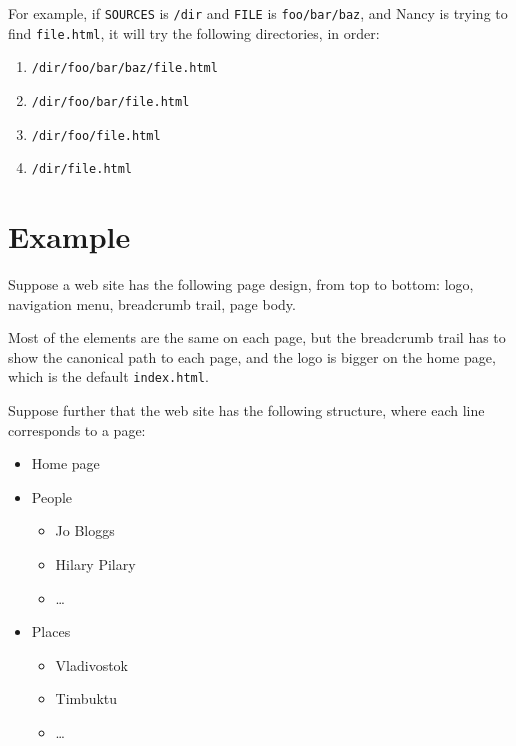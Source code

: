 \documentclass[english]{scrartcl}
\begin{document}
\begin{enumerate}
For example, if \verb|SOURCES| is \verb|/dir| and \verb|FILE| is \verb|foo/bar/baz|, and Nancy is trying to find \verb|file.html|, it will try the following directories, in order:

\begin{enumerate}
\item \verb|/dir/foo/bar/baz/file.html|
\item \verb|/dir/foo/bar/file.html|
\item \verb|/dir/foo/file.html|
\item \verb|/dir/file.html|
\end{enumerate}

\section{Example}

Suppose a web site has the following page design, from top to bottom: logo, navigation menu, breadcrumb trail, page body.

Most of the elements are the same on each page, but the breadcrumb trail has to show the canonical path to each page, and the logo is bigger on the home page, which is the default \verb|index.html|.

Suppose further that the web site has the following structure, where each line corresponds to a page:

\begin{itemize}
\item Home page
\item People
  \begin{itemize}
  \item Jo Bloggs
  \item Hilary Pilary
  \item \dots
  \end{itemize}
\item Places
  \begin{itemize}
  \item Vladivostok
  \item Timbuktu
  \item \dots
  \end{itemize}
\end{itemize}


\end{enumerate}
\end{document}
